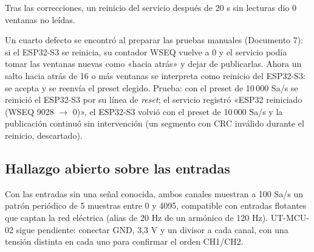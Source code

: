 \documentclass[12pt,a4paper]{article}
\begin{document}
Tras las correcciones, un reinicio del servicio después de 20 s sin lecturas dio 0 ventanas no leídas.

Un cuarto defecto se encontró al preparar las pruebas manuales (Documento 7): si el ESP32-S3 se reinicia, su contador WSEQ vuelve a 0 y el servicio podía tomar las ventanas nuevas como «hacia atrás» y dejar de publicarlas. Ahora un salto hacia atrás de 16 o más ventanas se interpreta como reinicio del ESP32-S3: se acepta y se reenvía el preset elegido. Prueba: con el preset de 10\,000 Sa/s se reinició el ESP32-S3 por su línea de \emph{reset}; el servicio registró «ESP32 reiniciado (WSEQ 9028 $\rightarrow$ 0)», el ESP32-S3 volvió con el preset de 10\,000 Sa/s y la publicación continuó sin intervención (un segmento con CRC inválido durante el reinicio, descartado).

\subsection{Hallazgo abierto sobre las entradas}

Con las entradas sin una señal conocida, ambos canales muestran a 100 Sa/s un patrón periódico de 5 muestras entre 0 y 4095, compatible con entradas flotantes que captan la red eléctrica (alias de 20 Hz de un armónico de 120 Hz). UT-MCU-02 sigue pendiente: conectar GND, 3{,}3 V y un divisor a cada canal, con una tensión distinta en cada uno para confirmar el orden CH1/CH2.
\end{document}
